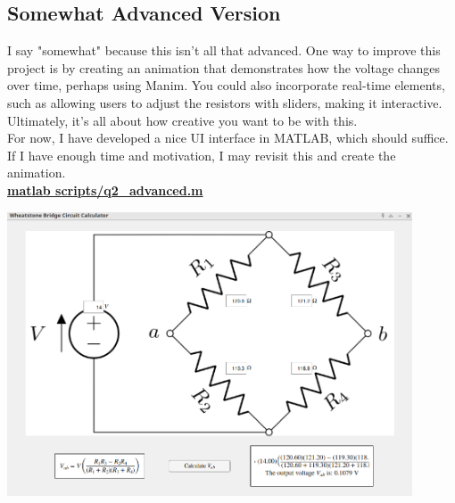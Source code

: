 \documentclass[a4paper, 12pt]{report}
\def\link{blue!50!black}
\begin{document}
    \subsection{Somewhat Advanced Version}
    I say "somewhat" because this isn't all that advanced. One way to improve this project is by creating an animation that demonstrates how the voltage changes over time, perhaps using Manim. You could also incorporate real-time elements, such as allowing users to adjust the resistors with sliders, making it interactive. Ultimately, it’s all about how creative you want to be with this.\\[1em]
    
    For now, I have developed a nice UI interface in MATLAB, which should suffice. If I have enough time and motivation, I may revisit this and create the animation.\\
    \vspace{1em}
    \href{https://github.com/sakx7/mathcompuni/blob/main/matlab scripts/q2_advanced.m}{\textcolor{\link}{\textbf{matlab scripts/q2\_advanced.m}}}\\[1em]
    
    \begin{center}
        \includegraphics[width=0.9\textwidth]{images/realwheat.png}
    \end{center}

    
    \newpage
    
\end{document}
